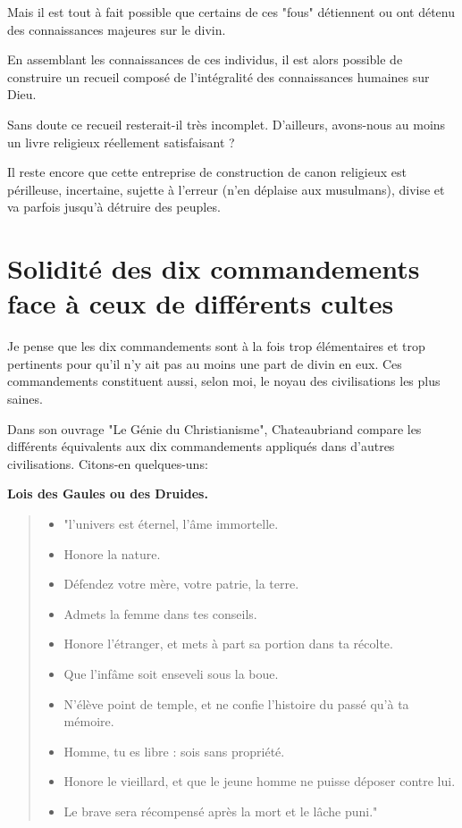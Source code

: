 Mais il est tout à fait possible que certains de ces "fous" détiennent ou ont détenu des connaissances majeures sur le divin.

En assemblant les connaissances de ces individus, il est alors possible de construire un recueil composé de l'intégralité des connaissances humaines sur Dieu.

Sans doute ce recueil resterait-il très incomplet. D'ailleurs, avons-nous au moins un livre religieux réellement satisfaisant ?

Il reste encore que cette entreprise de construction de canon religieux est périlleuse, incertaine, sujette à l'erreur (n'en déplaise aux musulmans), divise et va parfois jusqu'à détruire des peuples.

\chapter{Solidité des dix commandements face à ceux de différents cultes}

Je pense que les dix commandements sont à la fois trop élémentaires et trop pertinents pour qu’il n’y ait pas au moins une part de divin en eux. Ces commandements constituent aussi, selon moi, le noyau des civilisations les plus saines.

Dans son ouvrage "Le Génie du Christianisme", Chateaubriand compare les différents équivalents aux dix commandements appliqués dans d’autres civilisations. Citons-en quelques-uns:

\vfill
\newpage
\textbf{Lois des Gaules ou des Druides.}

\begin{quote}
\begin{itemize}

\item "l’univers est éternel, l’âme immortelle.
\item Honore la nature.
\item Défendez votre mère, votre patrie, la terre.
\item Admets la femme dans tes conseils.
\item Honore l’étranger, et mets à part sa portion dans ta récolte.
\item Que l’infâme soit enseveli sous la boue.
\item N’élève point de temple, et ne confie l’histoire du passé qu’à ta mémoire.
\item Homme, tu es libre : sois sans propriété.
\item Honore le vieillard, et que le jeune homme ne puisse déposer contre lui.
\item Le brave sera récompensé après la mort et le lâche puni."

\end{itemize}
\end{quote}

